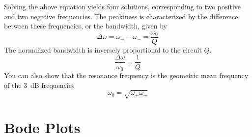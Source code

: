Solving the above equation yields four solutions, corresponding to two positive and two negative frequencies.  The peakiness is characterized by the difference between these frequencies, or the
bandwidth, given by
    \begin{equation} \label{eq:3db}
        \Delta\omega = \omega_+ - \omega_- = \frac{\omega_0}{Q}
    \end{equation}
The normalized bandwidth is inversely proportional to the circuit $Q$.
    \begin{equation}
        \frac{\Delta\omega}{\omega_0} =\frac{1}{Q}
    \end{equation}
You can also show that the resonance frequency is the geometric mean frequency of the $3$~dB frequencies
    \begin{equation}
        \omega_0 = \sqrt{\omega_+ \omega_-}
    \end{equation}
\section{Bode Plots}
